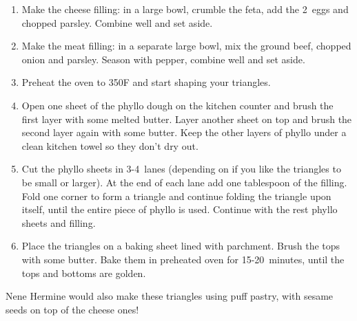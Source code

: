 \begin{enumerate}
    \item Make the cheese filling: in a large bowl, crumble the feta, add the 2~eggs and chopped parsley. Combine well and set aside.
    \item Make the meat filling: in a separate large bowl, mix the ground beef, chopped onion and parsley. Season with pepper, combine well and set aside.
    \item Preheat the oven to 350\degree F and start shaping your triangles.
    \item Open one sheet of the phyllo dough on the kitchen counter and brush the first layer with some melted butter. Layer another sheet on top and brush the second layer again with some butter. Keep the other layers of phyllo under a clean kitchen towel so they don't dry out.
    \item Cut the phyllo sheets in 3-4~lanes (depending on if you like the triangles to be small or larger). At the end of each lane add one tablespoon of the filling. Fold one corner to form a triangle and continue folding the triangle upon itself, until the entire piece of phyllo is used. Continue with the rest phyllo sheets and filling.
    \item Place the triangles on a baking sheet lined with parchment. Brush the tops with some butter. Bake them in preheated oven for 15-20~minutes, until the tops and bottoms are golden.
\end{enumerate}

Nene Hermine would also make these triangles using puff pastry, with sesame seeds on top of the cheese ones!